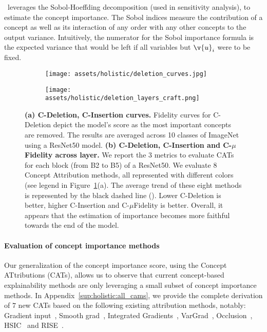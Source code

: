 \CRAFT~leverages the Sobol-Hoeffding decomposition (used in sensitivity analysis), to estimate the concept importance. The Sobol indices measure the contribution of a concept as well as its interaction of any order with any other concepts to the output variance. Intuitively, the numerator for the Sobol importance formula is the expected variance that would be left if all variables but $\v{u}_i$ were to be fixed.

\begin{figure}[ht]
\begin{subfigure}[b]{0.49\textwidth}
\texttt{[image: assets/holistic/deletion\_curves.jpg]}
    \caption{}
\end{subfigure}
\hfil
\begin{subfigure}[b]{0.49\textwidth}
\texttt{[image: assets/holistic/deletion\_layers\_craft.png]}
    \caption{}
\end{subfigure}
\caption{\textbf{(a) C-Deletion, C-Insertion curves.} Fidelity curves for C-Deletion depict the model's score as the most important concepts are removed. The results are averaged across 10 classes of ImageNet using a ResNet50 model.
\textbf{(b) C-Deletion, C-Insertion and C-$\mu$Fidelity across layer.} 
We report the $3$ metrics to evaluate CATs for each block (from B2 to B5) of a ResNet50. 
We evaluate $8$ Concept Attribution methods, all represented with different colors (see legend in  Figure~\ref{fig:holistic:deletion_curves}(a). The average trend of these eight methods is represented by the black dashed line (\dashed). Lower C-Deletion is better, higher C-Insertion and C-$\mu$Fidelity is better. Overall, it appears that the estimation of importance becomes more faithful towards the end of the model.
}
\label{fig:holistic:deletion_curves}
\end{figure}


\paragraph{Evaluation of concept importance methods}

Our generalization of the concept importance score, using the Concept ATtributions (CATs), allows us to observe that current concept-based explainability methods are only leveraging a small subset of concept importance methods. In Appendix~\ref{sup:holistic:all_cams}, we provide the complete derivation of $7$ new CATs based on the following existing attribution methods, notably: Gradient input~\cite{shrikumar2017learning}, Smooth grad~\cite{smilkov2017smoothgrad}, Integrated Gradients~\cite{sundararajan2017axiomatic}, VarGrad~\cite{hooker2018benchmark}, Occlusion~\cite{zeiler2014visualizing}, HSIC~\cite{novello2022making} and RISE~\cite{petsiuk2018rise}.



